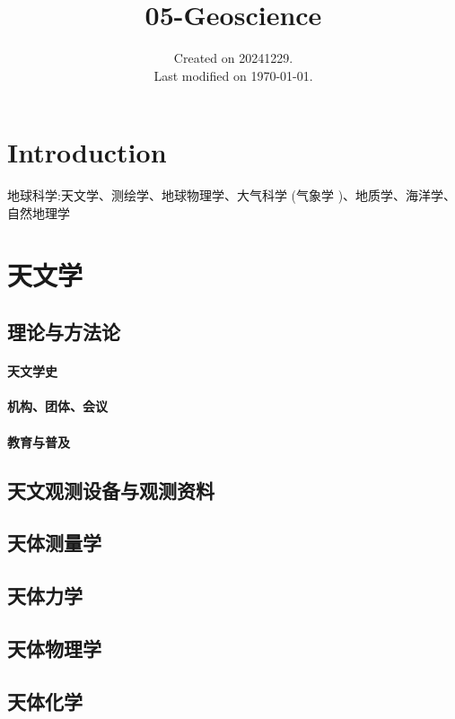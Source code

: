 \documentclass[UTF8]{../NatureUniverse}
\begin{document}
\title{05-Geoscience}
\date{Created on 20241229.\\   Last modified on \today.}
\maketitle
\tableofcontents

\chapter{Introduction}


地球科学:天文学、测绘学、地球物理学、大气科学 (气象学 )、地质学、海洋学、自然地理学








\chapter{天文学}
\section{理论与方法论}
    \subsubsection{天文学史}
    \subsubsection{机构、团体、会议}
    \subsubsection{教育与普及}
\section{天文观测设备与观测资料}
\section{天体测量学}
\section{天体力学}
\section{天体物理学}
\section{天体化学}
\end{document}
